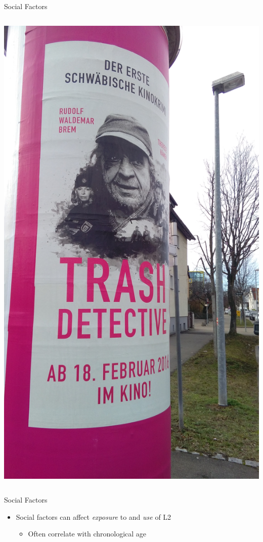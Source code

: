 \documentclass{beamer}
\begin{document}
\begin{frame}{Social Factors}
\begin{columns}
      \includegraphics[scale=0.05]{trash_detective.jpg}
  \end{columns}
\end{frame}

\begin{frame}{Social Factors}
  \begin{itemize}
    \item Social factors can affect \emph{exposure} to and \emph{use} of L2
    \begin{itemize}
      \item Often correlate with chronological age
    \end{itemize}
  \end{itemize}
\end{frame}
\end{document}
